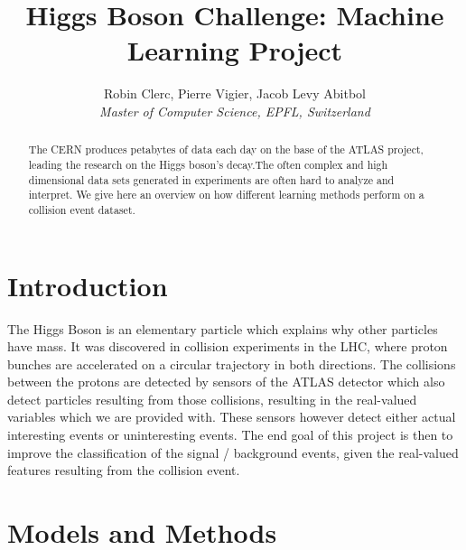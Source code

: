\documentclass[10pt,conference,compsocconf]{IEEEtran}
\begin{document}
\title{Higgs Boson Challenge: Machine Learning Project}

\author{
  Robin Clerc, Pierre Vigier, Jacob Levy Abitbol\\
  \textit{Master of Computer Science, EPFL, Switzerland}
}

\maketitle

\begin{abstract}
  The CERN produces petabytes of data each day on the base of the ATLAS project, leading the research on the Higgs boson's decay.The often complex and high dimensional data sets generated in experiments are often hard to analyze and interpret. We give here an overview on how different learning methods perform on a collision event dataset.
  \end{abstract}

\section{Introduction}

The Higgs Boson is an elementary particle which explains why other particles have mass. It was discovered in collision experiments in the LHC, where proton bunches are accelerated on a circular trajectory in both directions. The collisions between the protons are detected by sensors of the ATLAS detector which also detect particles resulting from those collisions, resulting in the real-valued variables which we are provided with. These sensors however detect either actual interesting events or uninteresting events. The end goal of this project is then to improve the classification of the signal / background events, given the real-valued features resulting from the collision event.

\section{Models and Methods}
\label{sec:structure-paper}
\end{document}
